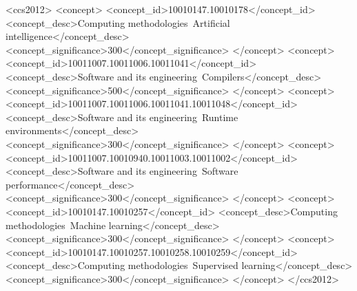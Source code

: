 \documentclass[sigplan,screen,review,anonymous]{acmart}
\providecommand{\DIFadd}[1]{{\protect\color{blue} \sf #1}} %
\providecommand{\DIFdel}[1]{{\protect\color{red} \scriptsize #1}} %
\providecommand{\DIFaddbegin}{} %
\providecommand{\DIFaddend}{} %
\providecommand{\DIFdelbegin}{} %
\providecommand{\DIFdelend}{} %
\begin{document}
\begin{abstract}
{\DIFdel{. Even so,predicting detailed execution behavior was still challenging, with the best }\DIFdelend \DIFaddbegin } \DIFadd{across all 1,768 pairs,counting unsuccessful predictions as incorrect. Across its
1,768 scored predictions, it achieved an aggregate score of \textbf{74.18} and a judge-assigned }\DIFaddend result-behavior score \DIFdelbegin \DIFdel{reaching only }\DIFdelend \DIFaddbegin \DIFadd{of }\DIFaddend \textbf{\DIFdelbegin \DIFdel{4.10}\DIFdelend \DIFaddbegin \DIFadd{5.04}\DIFaddend }/10. \DIFdelbegin \DIFdel{From these results , we observed that the models can often recognize semantic relationships between programs, but they still have difficulty understanding the exact execution outcomes. In addition, MLIRBench can be used for }\DIFdelend \DIFaddbegin \DIFadd{These results show that strong semantic classification does not necessarily imply accurate prediction
of detailed execution behavior, highlighting a gap in current LLM reasoning over compiler IRs. By exposing this gap through execution-validated program pairs, MLIRBench provides a reproducible foundation for studying semantic reasoning over compiler IRs and related }\DIFaddend tasks such as program repair and semantic classification\DIFdelbegin \DIFdel{, making it a useful and reproducible benchmark for studying compiler-related reasoning in LLMs}\DIFdelend .

\end{abstract}

\begin{CCSXML}
<ccs2012>
   <concept>
       <concept_id>10010147.10010178</concept_id>
       <concept_desc>Computing methodologies~Artificial intelligence</concept_desc>
       <concept_significance>300</concept_significance>
       </concept>
   <concept>
       <concept_id>10011007.10011006.10011041</concept_id>
       <concept_desc>Software and its engineering~Compilers</concept_desc>
       <concept_significance>500</concept_significance>
       </concept>
   <concept>
       <concept_id>10011007.10011006.10011041.10011048</concept_id>
       <concept_desc>Software and its engineering~Runtime environments</concept_desc>
       <concept_significance>300</concept_significance>
       </concept>
   <concept>
       <concept_id>10011007.10010940.10011003.10011002</concept_id>
       <concept_desc>Software and its engineering~Software performance</concept_desc>
       <concept_significance>300</concept_significance>
       </concept>
   <concept>
       <concept_id>10010147.10010257</concept_id>
       <concept_desc>Computing methodologies~Machine learning</concept_desc>
       <concept_significance>300</concept_significance>
       </concept>
   <concept>
       <concept_id>10010147.10010257.10010258.10010259</concept_id>
       <concept_desc>Computing methodologies~Supervised learning</concept_desc>
       <concept_significance>300</concept_significance>
       </concept>
 </ccs2012>
\end{CCSXML}
\end{document}
